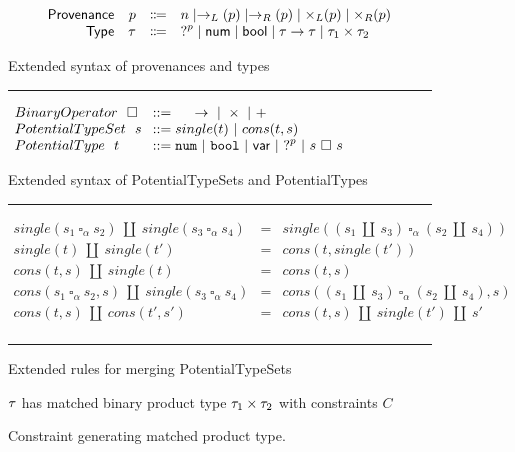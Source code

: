 \begin{figure}[h!]
\centering
\[\begin{array}{rrcl}
    \Prov & \Provp & \Coloneqq & n \mid \rightarrow_L(\Provp) \mid \rightarrow_R(\Provp) \mid \times_{L}(p) \mid \times_{R}(p) \\
    \TMName  & \TMV  & \Coloneqq & \TUnknown^p \mid \TNum \mid \TBool \mid \TArrow{\TMV}{\TMV} \mid \tau_1 \times \tau_2 \\
  \end{array}\]
\label{fig:syntax_possible_type_sets}
\caption{Extended syntax of provenances and types}
\hrule
$\arraycolsep=4pt\begin{array}{lll}
BinaryOperator~~ \square & ::=~~~~~
\rightarrow  ~\vert~ 
\times  ~\vert~ 
\mathtt{+}
\\
PotentialTypeSet~~ s & ::=
single(t) ~\vert~
cons(t, s)
\\
PotentialType~~ t & ::= 
  \tnum ~\vert~
  \tbool ~\vert~
  \TVar ~\vert~
  \tehole^p ~\vert~
  s ~\square~ s
  \\
\end{array}$
\label{fig:syntax_possible_type_sets}
\caption{Extended syntax of PotentialTypeSets and PotentialTypes}
\vspace{5px}
\hrule
\[\begin{array}{rcl}
    single(s_1 ~\square_{\alpha}~ s_2) ~\amalg~ single(s_3 ~\square_{\alpha}~ s_4) & = & single((s_1 ~\amalg~ s_3) ~\square_{\alpha}~ (s_2 ~\amalg~ s_4)) \\
    single(t) ~\amalg~ single(t') & = & cons(t, single(t')) \\
    cons(t,s) ~\amalg~ single(t) & = & cons(t, s) \\
    cons(s_1 ~\square_{\alpha}~ s_2, s) ~\amalg~ single(s_3 ~\square_{\alpha}~ s_4) & = & cons((s_1 ~\amalg~ s_3) ~\square_{\alpha}~ (s_2 ~\amalg~ s_4), s) \\
    cons(t,s) ~\amalg~ cons(t',s') & = & cons(t,s) ~\amalg~ single(t') ~\amalg~ s' \\
\end{array}\] 
\caption{Extended rules for merging PotentialTypeSets}
\vspace{5px} 
\hrule
\label{fig:extended_merging_possible_type_sets}
\vspace{-5px}
\end{figure}

\begin{figure}[h!]
  \raggedright
   $\TMV$ has matched binary product type $\TPair{\TMV_1}{\TMV_2}$ with constraints $C$
  \begin{mathpar}

  \end{mathpar}
  \caption{Constraint generating matched product type.}
  \label{fig:extended-calculus-matched-product}
\end{figure}

